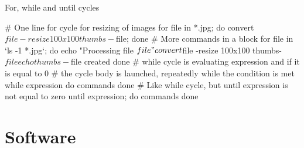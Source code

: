 \documentclass[compress, ucs, xelatex, 11pt, xcolor=svgnames,
  hyperref={
    bookmarks=true,
    unicode=true,
    colorlinks=true,
    pdftitle={Linux, command line and MetaCentrum},
    plainpages=false,
    pdfauthor={Vojtech Zeisek},
    pdfsubject={Course about use of Linux command line, writing shell scripts and using MetaCentrum of CESNET},
    pdfcreator={XeLaTeX},
    pdfkeywords={Linux, GNU, BASH, shell, command line, MetaCentrum},
    linkcolor=DarkRed,
    anchorcolor=DarkBlue,
    citecolor=Indigo,
    filecolor=NavyBlue,
    menucolor=DarkMagenta,
    urlcolor=DarkBlue,
    pdftex},
  url={hyphens, lowtilde} %
  ]{beamer}
\begin{document}
\begin{frame}[fragile]{For, while and until cycles}
  \begin{bashcode}
    # One line for cycle for resizing of images
    for file in *.jpg; do convert $file -resize 100x100 thumbs-$file; done
    # More commands in a block
    for file in `ls -1 *.jpg`; do
      echo "Processing file $file"
      convert $file -resize 100x100 thumbs-$file
      echo thumbs-$file created
      done
    # while cycle is evaluating expression and if it is equal to 0
    # the cycle body is launched, repeatedly while the condition is met
    while expression
      do
        commands
      done
    # Like while cycle, but until expression is not equal to zero
    until expression; do
      commands
      done
  \end{bashcode}
\end{frame}

\section{Software}
\end{document}
